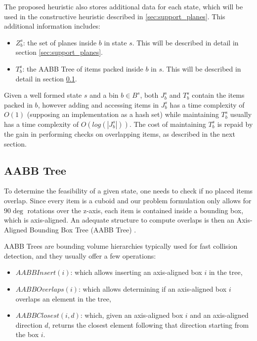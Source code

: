 The proposed heuristic also stores additional data for each state, which will be used in the constructive heuristic described in \cref{sec:support_planes}. This additional information includes:
\begin{itemize}
    \item $Z^s_b$: the set of planes inside $b$ in state $s$. This will be described in detail in section \ref{sec:support_planes}.
    \item $T^s_b$: the AABB Tree of items packed inside $b$ in $s$. This will be described in detail in section \ref{sec:problem_state:aabbtree}.
\end{itemize}
Given a well formed state $s$ and a bin $b \in B^s$, both $J^s_b$ and $T^s_b$ contain the items packed in $b$, however adding and accessing items in $J^s_b$ has a time complexity of $O(1)$ (supposing an implementation as a hash set) while maintaining $T^s_b$ usually has a time complexity of $O(log(|J^s_b|))$. The cost of maintaining $T^s_b$ is repaid by the gain in performing checks on overlapping items, as described in the next section.

\subsection{AABB Tree}
\label{sec:problem_state:aabbtree}%

To determine the feasibility of a given state, one needs to check if no placed items overlap.
Since every item is a cuboid and our problem formulation only allows for $90\deg$ rotations over the z-axis, each item is contained inside a bounding box, which is axis-aligned.
An adequate structure to compute overlaps is then an Axis-Aligned Bounding Box Tree (AABB Tree) \citep{bergen1997efficient}.

AABB Trees are bounding volume hierarchies typically used for fast collision detection, and they usually offer a few operations:
\begin{itemize}
    \item $AABBInsert(i)$: which allows inserting an axis-aligned box $i$ in the tree,
    \item $AABBOverlaps(i)$: which allows determining if an axis-aligned box $i$ overlaps an element in the tree,
    \item $AABBClosest(i, d)$: which, given an axis-aligned box $i$ and an axis-aligned direction $d$, returns the closest element following that direction starting from the box $i$.
\end{itemize}

